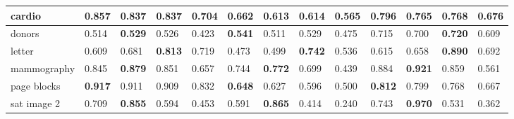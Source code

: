 \begin{table}[]
{\begin{tabular}{|l|llll|llllllll|}
cardio            & \multicolumn{1}{l|}{\textbf{0.857}} & \multicolumn{1}{l|}{0.837}          & \multicolumn{1}{l|}{0.837}          & 0.704 & \multicolumn{1}{l|}{\textbf{0.662}} & \multicolumn{1}{l|}{0.613}          & \multicolumn{1}{l|}{0.614}          & \multicolumn{1}{l|}{0.565} & \multicolumn{1}{l|}{\textbf{0.796}} & \multicolumn{1}{l|}{0.765}          & \multicolumn{1}{l|}{0.768}          & 0.676          \\ \hline
donors            & \multicolumn{1}{l|}{0.514}          & \multicolumn{1}{l|}{\textbf{0.529}} & \multicolumn{1}{l|}{0.526}          & 0.423 & \multicolumn{1}{l|}{\textbf{0.541}} & \multicolumn{1}{l|}{0.511}          & \multicolumn{1}{l|}{0.529}          & \multicolumn{1}{l|}{0.475} & \multicolumn{1}{l|}{0.715}          & \multicolumn{1}{l|}{0.700}          & \multicolumn{1}{l|}{\textbf{0.720}} & 0.609          \\ \hline
letter            & \multicolumn{1}{l|}{0.609}          & \multicolumn{1}{l|}{0.681}          & \multicolumn{1}{l|}{\textbf{0.813}} & 0.719 & \multicolumn{1}{l|}{0.473}          & \multicolumn{1}{l|}{0.499}          & \multicolumn{1}{l|}{\textbf{0.742}} & \multicolumn{1}{l|}{0.536} & \multicolumn{1}{l|}{0.615}          & \multicolumn{1}{l|}{0.658}          & \multicolumn{1}{l|}{\textbf{0.890}} & 0.692          \\ \hline
mammography       & \multicolumn{1}{l|}{0.845}          & \multicolumn{1}{l|}{\textbf{0.879}} & \multicolumn{1}{l|}{0.851}          & 0.657 & \multicolumn{1}{l|}{0.744}          & \multicolumn{1}{l|}{\textbf{0.772}} & \multicolumn{1}{l|}{0.699}          & \multicolumn{1}{l|}{0.439} & \multicolumn{1}{l|}{0.884}          & \multicolumn{1}{l|}{\textbf{0.921}} & \multicolumn{1}{l|}{0.859}          & 0.561          \\ \hline
page blocks       & \multicolumn{1}{l|}{\textbf{0.917}} & \multicolumn{1}{l|}{0.911}          & \multicolumn{1}{l|}{0.909}          & 0.832 & \multicolumn{1}{l|}{\textbf{0.648}} & \multicolumn{1}{l|}{0.627}          & \multicolumn{1}{l|}{0.596}          & \multicolumn{1}{l|}{0.500} & \multicolumn{1}{l|}{\textbf{0.812}} & \multicolumn{1}{l|}{0.799}          & \multicolumn{1}{l|}{0.768}          & 0.667          \\ \hline
sat image 2       & \multicolumn{1}{l|}{0.709}          & \multicolumn{1}{l|}{\textbf{0.855}} & \multicolumn{1}{l|}{0.594}          & 0.453 & \multicolumn{1}{l|}{0.591}          & \multicolumn{1}{l|}{\textbf{0.865}} & \multicolumn{1}{l|}{0.414}          & \multicolumn{1}{l|}{0.240} & \multicolumn{1}{l|}{0.743}          & \multicolumn{1}{l|}{\textbf{0.970}} & \multicolumn{1}{l|}{0.531}          & 0.362          \\ \hline

\end{tabular}}
\end{table}
